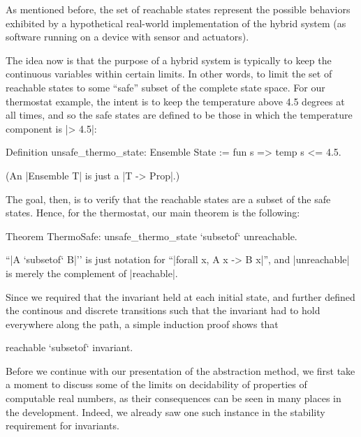 \documentclass[runningheads]{llncs}
\begin{document}
As mentioned before, the set of reachable states represent the possible behaviors exhibited by a hypothetical real-world implementation of the hybrid system (as software running on a device with sensor and actuators).

The idea now is that the purpose of a hybrid system is typically to keep the continuous variables within certain limits. In other words, to limit the set of reachable states to some ``safe'' subset of the complete state space. For our thermostat example, the intent is to keep the temperature above 4.5 degrees at all times, and so the safe states are defined to be those in which the temperature component is |> 4.5|:

\begin{code}
  Definition unsafe_thermo_state: Ensemble State :=
    fun s => temp s <= 4.5.
\end{code}
(An |Ensemble T| is just a |T -> Prop|.)

The goal, then, is to verify that the reachable states are a subset of the safe states. Hence, for the thermostat, our main theorem is the following:
\begin{code}
  Theorem ThermoSafe: unsafe_thermo_state `subsetof` unreachable.
\end{code}
``|A `subsetof` B|'' is just notation for ``|forall x, A x -> B x|'', and |unreachable| is merely the complement of |reachable|.

Since we required that the invariant held at each initial state, and further defined the continous and discrete transitions such that the invariant had to hold everywhere along the path, a simple induction proof shows that
\begin{code}
  reachable `subsetof` invariant.
\end{code}


Before we continue with our presentation of the abstraction method, we first take a moment to discuss some of the limits on decidability of properties of computable real numbers, as their consequences can be seen in many places in the development. Indeed, we already saw one such instance in the stability requirement for invariants.


\end{document}
